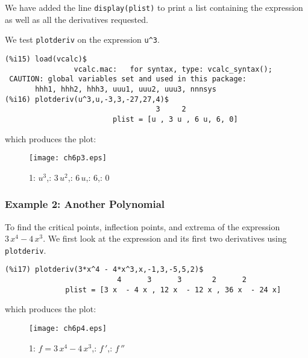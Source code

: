 \documentclass[12pt]{article}
\begin{document}
\smallskip

We have added the line \verb|display(plist)| to print a list containing the
  expression as well as all the derivatives requested.
  
  
We test \verb|plotderiv| on the expression \verb|u^3|.
\small
\begin{verbatim}
(%i15) load(vcalc)$
                vcalc.mac:   for syntax, type: vcalc_syntax(); 
 CAUTION: global variables set and used in this package:
       hhh1, hhh2, hhh3, uuu1, uuu2, uuu3, nnnsys 
(%i16) plotderiv(u^3,u,-3,3,-27,27,4)$
                                   3     2
                         plist = [u , 3 u , 6 u, 6, 0]
\end{verbatim}
\normalsize
\newpage

which produces the plot:
\begin{figure} [h]
   \centerline{\texttt{[image: ch6p3.eps]} }
	\caption{ 1: $u^3$,: $3\,u^2$,: $6\,u$,: $6$,: $0$ }
\end{figure}      


%


\subsubsection{Example 2: Another Polynomial}
To find the critical points, inflection points, and extrema of the expression
  $ 3\,x^{4} - 4\, x^{3}$.
We first look at the expression and its first two derivatives using
  \verb|plotderiv|.
\small
\begin{verbatim}
(%i17) plotderiv(3*x^4 - 4*x^3,x,-1,3,-5,5,2)$
                          4      3      3       2      2
              plist = [3 x  - 4 x , 12 x  - 12 x , 36 x  - 24 x]
\end{verbatim}
\normalsize
which produces the plot:
\begin{figure} [h]
   \centerline{\texttt{[image: ch6p4.eps]} }
	\caption{ 1: $f = 3\,x^4 - 4\, x^3$,: $f\,'$,: $f\,''$  }
\end{figure}      
\end{document}
